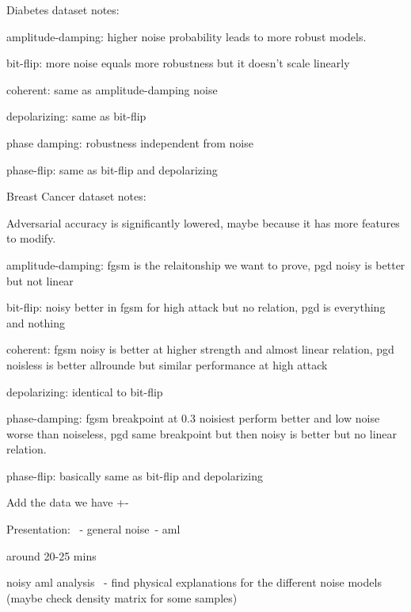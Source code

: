 Diabetes dataset notes: \

amplitude-damping: higher noise probability leads to more robust models. \

bit-flip: more noise equals more robustness but it doesn't scale linearly \

coherent: same as amplitude-damping noise \

depolarizing:  same as bit-flip \

phase damping: robustness independent from noise \

phase-flip: same as bit-flip and depolarizing \

Breast Cancer dataset notes: \

Adversarial accuracy is significantly lowered, maybe because it has
more features to modify. \

amplitude-damping: fgsm is the relaitonship we want to prove, pgd noisy is better but not linear \

bit-flip: noisy better in fgsm for high attack but no relation, pgd is everything and nothing \

coherent: fgsm noisy is better at higher strength and almost linear relation, pgd noisless is better allrounde but similar performance at high attack \

depolarizing: identical to bit-flip

phase-damping: fgsm breakpoint at 0.3 noisiest perform better and low noise worse than noiseless, pgd same breakpoint but then noisy is better but no linear relation. \

phase-flip: basically same as bit-flip and depolarizing \

Add the data we have +- \

Presentation: \
 - general noise\
 - aml \

 around 20-25 mins \

 noisy aml analysis \
 - find physical explanations for the different noise models (maybe check density matrix for some samples) \

\fi